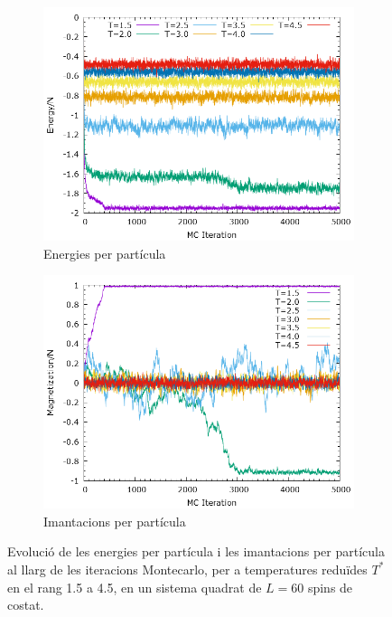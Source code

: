 \documentclass[a4paper]{article}
\begin{document}
\begin{figure}[H]
    \centering
    \begin{subfigure}{.49\textwidth}
        \centering
        \includegraphics[width=\textwidth]{SIM-L-060-energy-EVO.png}
        \caption{Energies per partícula}
        \label{fig:evo_ene}
    \end{subfigure}
    \begin{subfigure}{.49\textwidth}
        \centering
        \includegraphics[width=\textwidth]{SIM-L-060-magnetiz-EVO.png}
        \caption{Imantacions per partícula}
        \label{fig:evo_mag}
    \end{subfigure}
    \caption{Evolució de les energies per partícula i les imantacions per partícula al llarg de les iteracions Montecarlo, per a temperatures reduïdes $T^*$ en el rang 1.5 a 4.5, en un sistema quadrat de $L=60$ spins de costat.}
\label{fig:evo}
\end{figure}
\end{document}
